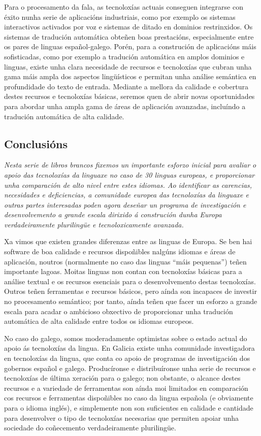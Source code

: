 \begin{multicols}{2}
Para o procesamento da fala, as tecnoloxías actuais conseguen integrarse con éxito nunha serie de aplicacións industriais, como por exemplo os sistemas interactivos activados por voz e sistemas de ditado en dominios restrinxidos. Os sistemas de tradución automática obteñen boas prestacións, especialmente entre os pares de linguas español-galego. Porén, para a construción de aplicacións máis sofisticadas, como por exemplo a tradución automática en amplos dominios e linguas, existe unha clara necesidade de recursos e tecnoloxías que cubran unha gama máis ampla dos aspectos lingüísticos e permitan unha análise semántica en profundidade do texto de entrada. Mediante a mellora da calidade e cobertura destes recursos e tecnoloxías básicas, seremos quen de abrir novas oportunidades para abordar unha ampla gama de áreas de aplicación avanzadas, incluíndo a tradución automática de alta calidade.


\subsection{Conclusións}

\emph{Nesta serie de libros brancos fixemos un importante esforzo inicial para avaliar o apoio das tecnoloxías da linguaxe no caso de 30 linguas europeas, e proporcionar unha comparación de alto nivel entre estes idiomas. Ao identificar as carencias, necesidades e deficiencias, a comunidade europea das tecnoloxías da linguaxe e outras partes interesadas poden agora deseñar un programa de investigación e desenvolvemento a grande escala dirixido á construción dunha Europa verdadeiramente plurilingüe e tecnoloxicamente avanzada.}

Xa vimos que existen grandes diferenzas entre as linguas de Europa. Se ben hai software de boa calidade e recursos dispoñibles nalgúns idiomas e áreas de aplicación, noutros (normalmente no caso das linguas “máis pequenas”) teñen importante lagoas. Moitas linguas non contan con tecnoloxías básicas para a análise textual e os recursos esenciais para o desenvolvemento destas tecnoloxías. Outros teñen ferramentas e recursos básicos, pero aínda son incapaces de investir no procesamento semántico; por tanto, aínda teñen que facer un esforzo a grande escala para acadar o ambicioso obxectivo de proporcionar unha tradución automática de alta calidade entre todos os idiomas europeos.

No caso do galego, somos moderadamente optimistas sobre o estado actual do apoio ás tecnoloxías da lingua. En Galicia existe unha comunidade investigadora en tecnoloxías da lingua, que conta co apoio de programas de investigación dos gobernos español e galego. Producíronse e distribuíronse unha serie de recursos e tecnoloxías de última xeración para o galego; non obstante, o alcance destes recursos e a variedade de ferramentas son aínda moi limitados en comparación cos recursos e ferramentas dispoñibles no caso da lingua española (e obviamente para o idioma inglés), e simplemente non son suficientes en calidade e cantidade para desenvolver o tipo de tecnoloxías necesarias que permiten apoiar unha sociedade do coñecemento verdadeiramente plurilingüe.


\end{multicols}
